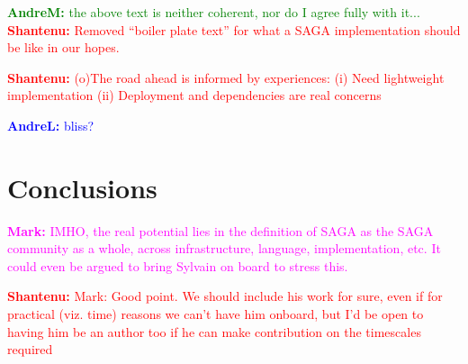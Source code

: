 \documentclass{article}
\newcommand{\B}[1]{\textbf{#1}}
\newcommand{\jhanote}[1]{{\textcolor{red}{     \B{Shantenu:} #1 }}}
\newcommand{\amnote}[1]{{\textcolor{green}{   \B{AndreM:  } #1 }}}
\newcommand{\alnote}[1]{{\textcolor{blue}{    \B{AndreL:  } #1 }}}
\newcommand{\msnote}[1]{{\textcolor{magenta}{ \B{Mark:    } #1 }}}
\newcommand{\hknote}[1]{{\textcolor{red}{  \B{Hartmut: } #1 }}}
\newcommand{\jhanote}[1]{}
\newcommand{\amnote}[1]{}
\newcommand{\alnote}[1]{}
\newcommand{\msnote}[1]{}
\newcommand{\hknote}[1]{}
\begin{document}

  \amnote{the above text is neither coherent, nor do I agree fully with it...}
  \jhanote{Removed ``boiler plate text'' for what a SAGA implementation should
  be like in our hopes.}

  \jhanote{(o)The road ahead is informed by experiences: (i) Need lightweight
  implementation (ii) Deployment and dependencies are real concerns}
    
  \alnote{bliss?}






\section{Conclusions}
\label{sec:conclusions}

 \msnote{IMHO, the real potential lies in the definition of SAGA as the SAGA
 community as a whole, across infrastructure, language, implementation, etc.  It
 could even be argued to bring Sylvain on board to stress this.}

 \jhanote{Mark: Good point. We should include his work for sure, even if for
 practical (viz. time) reasons we can't have him onboard, but I'd be open to
 having him be an author too if he can make contribution on the timescales
 required}
\end{document}
